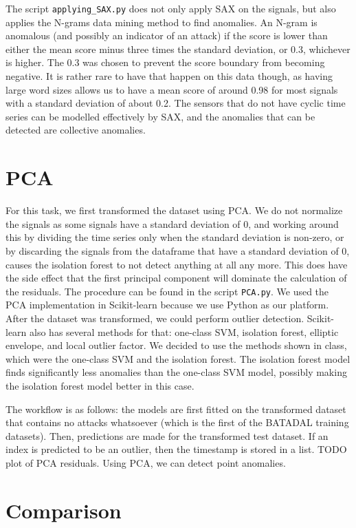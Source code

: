 \documentclass[]{article}
\begin{document}
The script \texttt{applying\_SAX.py} does not only apply SAX on the signals, but also applies the N-grams data mining method to find anomalies. An N-gram is anomalous (and possibly an indicator of an attack) if the score is lower than either the mean score minus three times the standard deviation, or 0.3, whichever is higher. The 0.3 was chosen to prevent the score boundary from becoming negative. It is rather rare to have that happen on this data though, as having large word sizes allows us to have a mean score of around 0.98 for most signals with a standard deviation of about 0.2. The sensors that do not have cyclic time series can be modelled effectively by SAX, and the anomalies that can be detected are collective anomalies.
\clearpage
\section{PCA}
For this task, we first transformed the dataset using PCA. We do not normalize the signals as some signals have a standard deviation of 0, and working around this by dividing the time series only when the standard deviation is non-zero, or by discarding the signals from the dataframe that have a standard deviation of 0, causes the isolation forest to not detect anything at all any more. This does have the side effect that the first principal component will dominate the calculation of the residuals. The procedure can be found in the script \texttt{PCA.py}. We used the PCA implementation in Scikit-learn because we use Python as our platform. After the dataset was transformed, we could perform outlier detection. Scikit-learn also has several methods for that: one-class SVM, isolation forest, elliptic envelope, and local outlier factor. We decided to use the methods shown in class, which were the one-class SVM and the isolation forest. The isolation forest model finds significantly less anomalies than the one-class SVM model, possibly making the isolation forest model better in this case.

The workflow is as follows: the models are first fitted on the transformed dataset that contains no attacks whatsoever (which is the first of the BATADAL training datasets). Then, predictions are made for the transformed test dataset. If an index is predicted to be an outlier, then the timestamp is stored in a list. TODO plot of PCA residuals. Using PCA, we can detect point anomalies.
\clearpage
\section{Comparison} 
\end{document}
